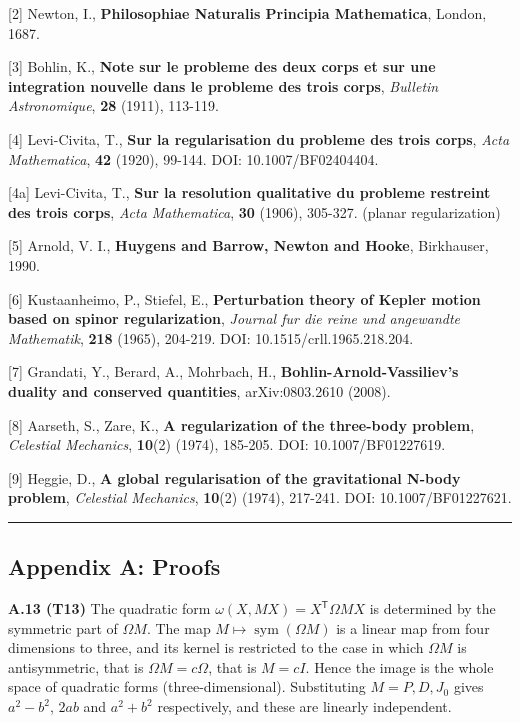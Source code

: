 \documentclass[
  a4paper,
]{article}
\begin{document}
{[}2{]} Newton, I., \textbf{Philosophiae Naturalis Principia
Mathematica}, London, 1687.

{[}3{]} Bohlin, K., \textbf{Note sur le probleme des deux corps et sur
une integration nouvelle dans le probleme des trois corps},
\emph{Bulletin Astronomique}, \textbf{28} (1911), 113-119.

{[}4{]} Levi-Civita, T., \textbf{Sur la regularisation du probleme des
trois corps}, \emph{Acta Mathematica}, \textbf{42} (1920), 99-144. DOI:
10.1007/BF02404404.

{[}4a{]} Levi-Civita, T., \textbf{Sur la resolution qualitative du
probleme restreint des trois corps}, \emph{Acta Mathematica},
\textbf{30} (1906), 305-327. (planar regularization)

{[}5{]} Arnold, V. I., \textbf{Huygens and Barrow, Newton and Hooke},
Birkhauser, 1990.

{[}6{]} Kustaanheimo, P., Stiefel, E., \textbf{Perturbation theory of
Kepler motion based on spinor regularization}, \emph{Journal fur die
reine und angewandte Mathematik}, \textbf{218} (1965), 204-219. DOI:
10.1515/crll.1965.218.204.

{[}7{]} Grandati, Y., Berard, A., Mohrbach, H.,
\textbf{Bohlin-Arnold-Vassiliev's duality and conserved quantities},
arXiv:0803.2610 (2008).

{[}8{]} Aarseth, S., Zare, K., \textbf{A regularization of the
three-body problem}, \emph{Celestial Mechanics}, \textbf{10}(2) (1974),
185-205. DOI: 10.1007/BF01227619.

{[}9{]} Heggie, D., \textbf{A global regularisation of the gravitational
N-body problem}, \emph{Celestial Mechanics}, \textbf{10}(2) (1974),
217-241. DOI: 10.1007/BF01227621.

\begin{center}\rule{0.5\linewidth}{0.5pt}\end{center}

\subsection{Appendix A: Proofs}\label{appendix-a-proofs}

\textbf{A.13 (T13)} The quadratic form
\(\omega(X,MX)=X^{\mathsf T}\Omega MX\) is determined by the symmetric
part of \(\Omega M\). The map \(M\mapsto\operatorname{sym}(\Omega M)\)
is a linear map from four dimensions to three, and its kernel is
restricted to the case in which \(\Omega M\) is antisymmetric, that is
\(\Omega M=c\Omega\), that is \(M=cI\). Hence the image is the whole
space of quadratic forms (three-dimensional). Substituting \(M=P,D,J_0\)
gives \(a^2-b^2\), \(2ab\) and \(a^2+b^2\) respectively, and these are
linearly independent.
\end{document}
